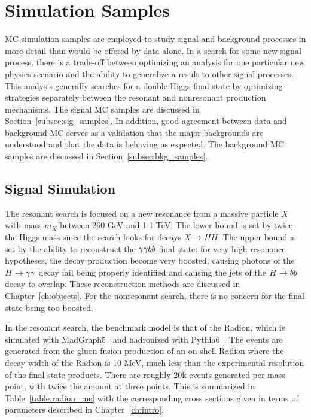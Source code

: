 \section{Simulation Samples\label{sec:sim}}


MC simulation samples are employed to study signal and background processes in more detail
than would be offered by data alone. In a search for some new signal process, there is a trade-off
between optimizing an analysis for one particular new physics scenario and the ability to
generalize a result to other signal processes. This analysis generally searches for a double Higgs final
state by optimizing strategies separately between the resonant and nonresonant production mechanisms.
The signal MC samples are discussed in Section~\ref{subsec:sig_samples}.
In addition, good agreement between data
and background MC serves as a validation that the major backgrounds are understood and that
the data is behaving as expected. The background MC samples are discussed in
Section~\ref{subsec:bkg_samples}.

\subsection{Signal Simulation\label{subsec:sig_samples}}

The resonant search is focused on a new resonance from a massive particle $X$ with mass $m_X$ between
260 GeV and 1.1 TeV. The lower bound is set by twice the Higgs mass since the search looks for decays
$X\rightarrow HH$. The upper bound is set by the ability to reconstruct the $\gamma\gamma b\bar{b}$ final state: for
very high resonance hypotheses, the decay production become very boosted, causing photons of the
$H\to\gamma\gamma$ decay fail being properly identified and causing the jets of the $H\to b\bar{b}$ decay to overlap.
These reconstruction methods are discussed in Chapter~\ref{ch:objects}. For the nonresonant
search, there is no concern for the final state being too boosted.

In the resonant search, the benchmark model is that of the Radion, which is simulated with
MadGraph5~\cite{Madgraph_Alwall:2011uj} and hadronized with Pythia6~\cite{Pythia6-0}. The events are
generated from the gluon-fusion production of an on-shell Radion where the decay width of the Radion
is 10 MeV, much less than the experimental resolution of the final state products. There are roughly
20k events generated per mass point, with twice the amount at three points.
This is summarized in Table~\ref{table:radion_mc} with the corresponding cross sections given in terms
of parameters described in Chapter~\ref{ch:intro}.

